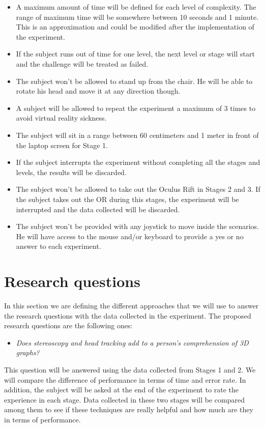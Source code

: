 \begin{itemize}
\item
  A maximum amount of time will be defined for each level of complexity.
  The range of maximum time will be somewhere between 10 seconds and 1
  minute. This is an approximation and could be modified after the
  implementation of the experiment.
\item
  If the subject runs out of time for one level, the next level or stage
  will start and the challenge will be treated as failed.
\item
  The subject won't be allowed to stand up from the chair. He will be
  able to rotate his head and move it at any direction though.
\item
  A subject will be allowed to repeat the experiment a maximum of 3
  times to avoid virtual reality sickness.
\item
  The subject will sit in a range between 60 centimeters and 1 meter in
  front of the laptop screen for Stage 1.
\item
  If the subject interrupts the experiment without completing all the
  stages and levels, the results will be discarded.
\item
  The subject won't be allowed to take out the Oculus Rift in Stages 2
  and 3. If the subject takes out the OR during this stages, the
  experiment will be interrupted and the data collected will be
  discarded.
\item
  The subject won't be provided with any joystick to move inside the
  scenarios. He will have access to the mouse and/or keyboard to provide
  a yes or no answer to each experiment.
\end{itemize}

\section{Research questions}\label{research-questions}

In this section we are defining the different approaches that we will
use to answer the research questions with the data collected in the
experiment. The proposed research questions are the following ones:

\begin{itemize}
\item
  \emph{Does stereoscopy and head tracking add to a person's
  comprehension of 3D graphs?}
\end{itemize}

This question will be answered using the data collected from Stages 1
and 2. We will compare the difference of performance in terms of time
and error rate. In addition, the subject will be asked at the end of the
experiment to rate the experience in each stage. Data collected in these
two stages will be compared among them to see if these techniques are
really helpful and how much are they in terms of performance.

